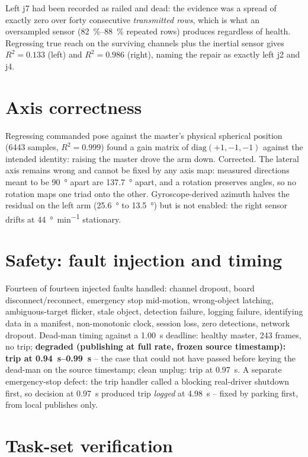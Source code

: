 Left j7 had been recorded as railed and dead: the evidence was a spread of
exactly zero over forty consecutive \emph{transmitted rows}, which is what
an oversampled sensor (\SIrange{82}{88}{\percent} repeated rows) produces
regardless of health. Regressing true reach on the surviving channels plus
the inertial sensor gives $R^2=\num{0.133}$ (left) and $R^2=\num{0.986}$
(right), naming the repair as exactly left j2 and j4.

\section{Axis correctness}

Regressing commanded pose against the master's physical spherical position
(\num{6443} samples, $R^2=\num{0.999}$) found a gain matrix of
$\mathrm{diag}(+1,-1,-1)$ against the intended identity: raising the master
drove the arm down. Corrected. The lateral axis remains wrong and cannot be
fixed by any axis map: measured directions meant to be \SI{90}{\degree}
apart are \SI{137.7}{\degree} apart, and a rotation preserves angles, so no
rotation maps one triad onto the other. Gyroscope-derived azimuth halves the
residual on the left arm (\SI{25.6}{\degree} to \SI{13.5}{\degree}) but is
not enabled: the right sensor drifts at \SI{44}{\degree\per\minute}
stationary.

\section{Safety: fault injection and timing}

Fourteen of fourteen injected faults handled: channel dropout, board
disconnect/reconnect, emergency stop mid-motion, wrong-object latching,
ambiguous-target flicker, stale object, detection failure, logging failure,
identifying data in a manifest, non-monotonic clock, session loss, zero
detections, network dropout. Dead-man timing against a \SI{1.00}{\second}
deadline: healthy master, 243 frames, no trip; \textbf{degraded (publishing
at full rate, frozen source timestamp): trip at \SIrange{0.94}{0.99}{\second}}
-- the case that could not have passed before keying the dead-man on the
source timestamp; clean unplug: trip at \SI{0.97}{\second}. A separate
emergency-stop defect: the trip handler called a blocking real-driver
shutdown first, so decision at \SI{0.97}{\second} produced trip \emph{logged}
at \SI{4.98}{\second} -- fixed by parking first, from local publishes only.

\section{Task-set verification}

